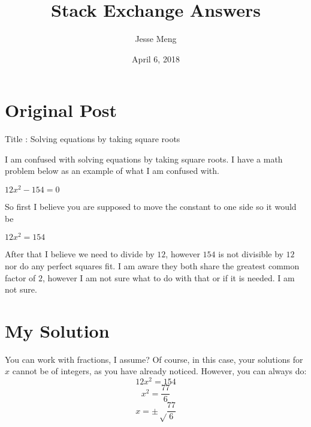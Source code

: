 \documentclass{article}
\title{Stack Exchange Answers}
\author{Jesse Meng }
\date{April 6, 2018}
\begin{document}
\maketitle

\section{Original Post}
Title : Solving equations by taking square roots

I am confused with solving equations by taking square roots. I have a math problem below as an example of what I am confused with.

$12x^2-154=0$

So first I believe you are supposed to move the constant to one side so it would be 

$12x^2=154 $

After that I believe we need to divide by $12$, however $154$ is not divisible by $12$ nor do any perfect squares fit. I am aware they both share the greatest common factor of $2$, however I am not sure what to do with that or if it is needed. I am not sure.
\section{My Solution}
You can work with fractions, I assume?
Of course, in this case, your solutions for $x$ cannot be of integers, as you have already noticed. However, you can always do:
$$12x^2=154$$
$$x^2=\frac{77}{6}$$
$$x=\pm\sqrt\frac{77}{6}$$
\end{document}
